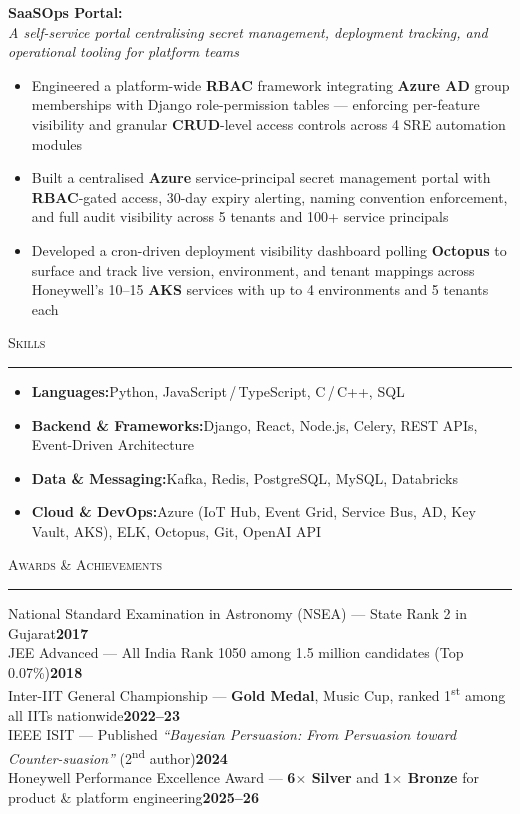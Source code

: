 \documentclass[9pt]{article}
\newcommand{\ressection}[1]{%
  \vspace{5pt}%
  \noindent\textsc{#1}\\[-8pt]%
  \noindent\rule{\textwidth}{0.4pt}\vspace{4pt}%
}
\newcommand{\subp}[2]{\vspace{3pt}\noindent\textbf{#1:}\\[-2pt]\noindent\textit{#2}\vspace{0pt}}
\newcommand{\achieve}[2]{%
  \noindent #1\dotfill\;\textbf{#2}\\[1.5pt]%
}
\begin{document}
\subp{SaaSOps Portal}{A self-service portal centralising secret management, deployment tracking, and operational tooling for platform teams}
\begin{itemize}
  \item Engineered a platform-wide \textbf{RBAC} framework integrating \textbf{Azure AD} group
        memberships with Django role-permission tables — enforcing per-feature visibility
        and granular \textbf{CRUD}-level access controls across 4 SRE automation modules
  \item Built a centralised \textbf{Azure} service-principal secret management portal with
        \textbf{RBAC}-gated access, 30-day expiry alerting, naming convention enforcement,
        and full audit visibility across 5 tenants and 100+ service principals
  \item Developed a cron-driven deployment visibility dashboard polling \textbf{Octopus} to
        surface and track live version, environment, and tenant mappings across
        Honeywell's 10--15 \textbf{AKS} services with up to 4 environments and 5 tenants each
\end{itemize}

\ressection{Skills}

\begin{itemize}
  \item \textbf{Languages:}\;Python, JavaScript\,/\,TypeScript, C\,/\,C++, SQL
  \item \textbf{Backend \& Frameworks:}\;Django, React, Node.js, Celery, REST APIs, Event-Driven Architecture
  \item \textbf{Data \& Messaging:}\;Kafka, Redis, PostgreSQL, MySQL, Databricks
  \item \textbf{Cloud \& DevOps:}\;Azure (IoT Hub, Event Grid, Service Bus, AD, Key Vault, AKS), ELK, Octopus, Git, OpenAI API
\end{itemize}

\ressection{Awards \& Achievements}

\achieve{National Standard Examination in Astronomy (NSEA) --- State Rank 2 in Gujarat}{2017}
\achieve{JEE Advanced --- All India Rank 1050 among 1.5 million candidates (Top 0.07\%)}{2018}
\achieve{Inter-IIT General Championship --- \textbf{Gold Medal}, Music Cup, ranked 1\textsuperscript{st} among all IITs nationwide}{2022--23}
\achieve{IEEE ISIT --- Published \textit{``Bayesian Persuasion: From Persuasion toward Counter-suasion''} (2\textsuperscript{nd} author)}{2024}
\achieve{Honeywell Performance Excellence Award --- \textbf{6$\times$ Silver} and \textbf{1$\times$ Bronze} for product \& platform engineering}{2025--26}
\end{document}
